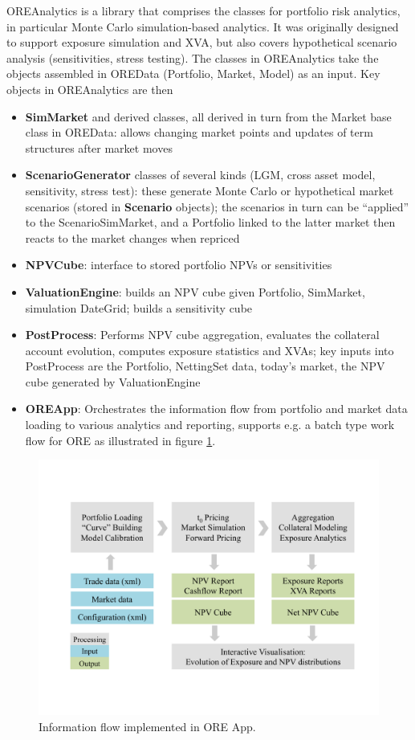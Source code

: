 \documentclass[12pt, a4paper]{report}
\begin{document}
OREAnalytics is a library that comprises the classes for portfolio risk analytics, in particular Monte Carlo simulation-based analytics. It was originally designed to support exposure simulation and XVA, but also covers hypothetical scenario analysis
(sensitivities, stress testing). The classes in OREAnalytics take the objects assembled in OREData (Portfolio, Market, Model) as an input. Key objects in OREAnalytics are then
\begin{itemize}
\item {\bf SimMarket} and derived classes, all derived in turn from the Market base class in OREData: allows changing market points and updates of term structures after market moves
\item {\bf ScenarioGenerator} classes of several kinds (LGM, cross asset model, sensitivity, stress test): these generate Monte Carlo or hypothetical market scenarios (stored in {\bf Scenario} objects);
the scenarios in turn can be ``applied'' to the ScenarioSimMarket, and a Portfolio linked to the latter market then reacts to the market changes when repriced
\item {\bf NPVCube}: interface to stored portfolio NPVs or sensitivities
\item {\bf ValuationEngine}: builds an NPV cube given Portfolio, SimMarket, simulation DateGrid; builds a sensitivity cube
\item {\bf PostProcess}: Performs NPV cube aggregation, evaluates the collateral account evolution, computes exposure statistics and XVAs; key inputs into PostProcess are the Portfolio, NettingSet data, today's market, the NPV cube generated by ValuationEngine
\item {\bf OREApp}: Orchestrates the information flow from portfolio and market data loading to various analytics and reporting, supports e.g. a batch type work flow for ORE as illustrated in figure \ref{fig_process}.
\end{itemize}

\begin{figure}[h]
\begin{center}
\includegraphics[scale=0.6]{data/process.pdf}
\end{center}
\caption{ Information flow implemented in ORE App. }
\label{fig_process}
\end{figure}
\end{document}
